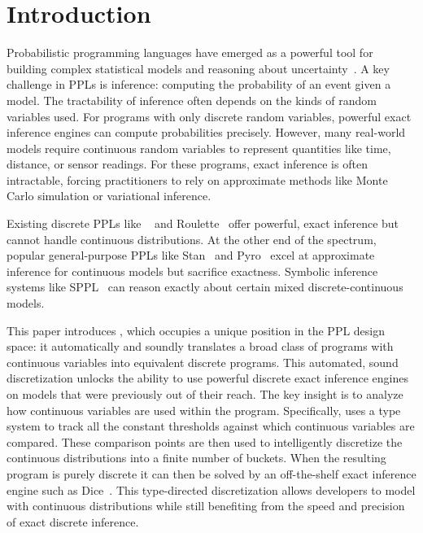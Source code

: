 \section{Introduction}\label{sec:intro}
Probabilistic programming languages have emerged as a powerful tool for building complex statistical models and reasoning about uncertainty~\cite{Moy2025Roulette,Holtzen2020Dice,DeRaedt2007ProbLog,Saad2021SPPL,Carpenter2017Stan,Salvatier2016PyMC3,Bingham2019Pyro,Dillon2017TFP,Tran2016Edward,Tolpin2016Anglican,Goodman2014WebPPL,Pfeffer2009Figaro,Minka2018InferNET,Ge2018Turing,CusumanoTowner2019Gen,Tehrani2020BeanMachine,Goodman2008Church}. A key challenge in PPLs is inference: computing the probability of an event given a model. The tractability of inference often depends on the kinds of random variables used. For programs with only discrete random variables, powerful exact inference engines can compute probabilities precisely. However, many real-world models require continuous random variables to represent quantities like time, distance, or sensor readings. For these programs, exact inference is often intractable, forcing practitioners to rely on approximate methods like Monte Carlo simulation or variational inference. 

Existing discrete PPLs like \Dice~\cite{Holtzen2020Dice} and Roulette~\cite{Moy2025Roulette} offer powerful, exact inference but cannot handle continuous distributions. At the other end of the spectrum, popular general-purpose PPLs like Stan~\cite{Carpenter2017Stan} and Pyro~\cite{Bingham2019Pyro} excel at approximate inference for continuous models but sacrifice exactness. Symbolic inference systems like SPPL~\cite{Saad2021SPPL} can reason exactly about certain mixed discrete-continuous models.

This paper introduces \Slice{}, which occupies a unique position in the PPL design space: it automatically and soundly translates a broad class of programs with continuous variables into equivalent discrete programs. This automated, sound discretization unlocks the ability to use powerful discrete exact inference engines on models that were previously out of their reach. The key insight is to analyze how continuous variables are used within the program. Specifically, \Slice{} uses a type system to track all the constant thresholds against which continuous variables are compared. These comparison points are then used to intelligently discretize the continuous distributions into a finite number of buckets. When the resulting program is purely discrete it can then be solved by an off-the-shelf exact inference engine such as Dice~\cite{Holtzen2020Dice}. This type-directed discretization allows developers to model with continuous distributions while still benefiting from the speed and precision of exact discrete inference.

